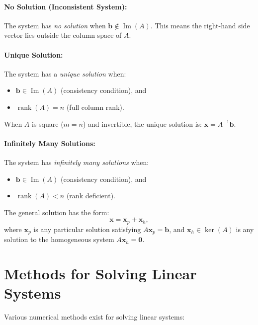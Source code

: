 \documentclass[../../main.tex]{subfiles}
\begin{document}
\paragraph{No Solution (Inconsistent System):} The system has \emph{no solution} when $\mathbf{b} \notin \operatorname{Im}(A)$. This means the right-hand side vector lies outside the column space of $A$.
\paragraph{Unique Solution:} The system has a \emph{unique solution} when:
\begin{itemize}
    \item $\mathbf{b} \in \operatorname{Im}(A)$ (consistency condition), and
    \item $\operatorname{rank}(A) = n$ (full column rank).
\end{itemize}
When $A$ is square ($m = n$) and invertible, the unique solution is: $\mathbf{x} = A^{-1}\mathbf{b}.$

\paragraph{Infinitely Many Solutions:} The system has \emph{infinitely many solutions} when:
\begin{itemize}
    \item $\mathbf{b} \in \operatorname{Im}(A)$ (consistency condition), and
    \item $\operatorname{rank}(A) < n$ (rank deficient).
\end{itemize}
The general solution has the form:
\[
    \mathbf{x} = \mathbf{x}_p + \mathbf{x}_h,
\]
where $\mathbf{x}_p$ is any particular solution satisfying $A\mathbf{x}_p = \mathbf{b}$, and $\mathbf{x}_h \in \ker(A)$ is any solution to the homogeneous system $A\mathbf{x}_h = \mathbf{0}$.

\section{Methods for Solving Linear Systems}
Various numerical methods exist for solving linear systems:
\end{document}
